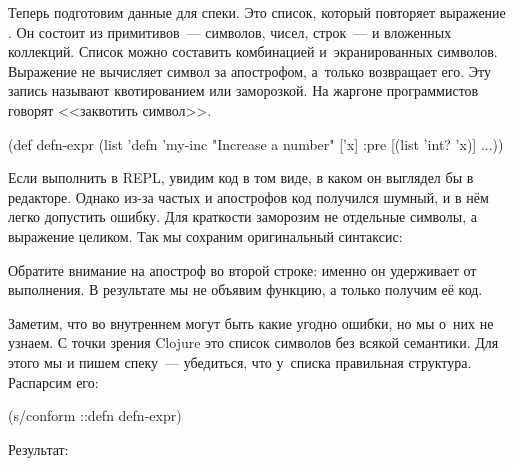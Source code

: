 \fi


Теперь подготовим данные для спеки. Это список, который повторяет выражение
. Он состоит из примитивов~--- символов, чисел, строк~--- и вложенных
коллекций. Список можно составить комбинацией  и~экранированных
символов. Выражение  не вычисляет символ за апострофом,
а~только возвращает его. Эту запись называют квотированием  или
заморозкой. На жаргоне программистов говорят <<заквотить символ>>.


\begin{clojure}
(def defn-expr
  (list 'defn 'my-inc
        "Increase a number"
        ['x]
        {:pre [(list 'int? 'x)]} ...))
\end{clojure}


Если выполнить  в REPL, увидим код в том виде, в каком он
выглядел бы в редакторе. Однако из-за частых  и апострофов код
получился шумный, и в нём легко допустить ошибку. Для краткости заморозим не
отдельные символы, а выражение  целиком. Так мы сохраним оригинальный
синтаксис:




Обратите внимание на апостроф во второй строке: именно он удерживает 
от выполнения. В результате мы не объявим функцию, а только получим её код.

Заметим, что во внутреннем  могут быть какие угодно ошибки, но мы
о~них не узнаем. С точки зрения Clojure это список символов без всякой
семантики. Для этого мы и пишем спеку~--- убедиться, что у~списка правильная
структура. Распарсим его:


\begin{clojure}
(s/conform ::defn defn-expr)
\end{clojure}


\noindent
Результат:

\iflarge\vspace{15mm}\pagebreak[4]\fi

\ifnarrow




